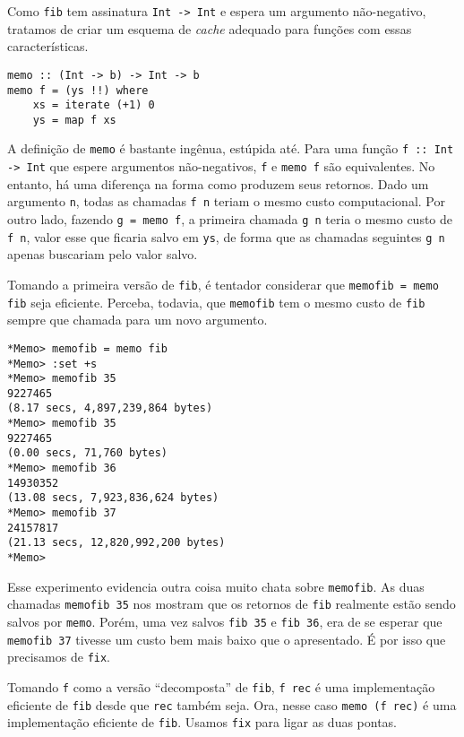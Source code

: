 \documentclass[a4paper]{article}
\begin{document}
Como \texttt{fib} tem assinatura \texttt{Int -> Int} e espera um argumento não-negativo, tratamos de criar um esquema de \emph{cache} adequado para funções com essas características.

\begin{verbatim}
memo :: (Int -> b) -> Int -> b
memo f = (ys !!) where
	xs = iterate (+1) 0
	ys = map f xs
\end{verbatim}

A definição de \texttt{memo} é bastante ingênua, estúpida até.
Para uma função \mbox{\texttt{f :: Int -> Int}} que espere argumentos não-negativos, \texttt{f} e \texttt{memo f} são equivalentes.
No entanto, há uma diferença na forma como produzem seus retornos.
Dado um argumento \texttt{n}, todas as chamadas \mbox{\texttt{f n}} teriam o mesmo custo computacional.
Por outro lado, fazendo \texttt{g = memo f}, a primeira chamada \texttt{g n} teria o mesmo custo de \texttt{f n}, valor esse que ficaria salvo em \texttt{ys}, de forma que as chamadas seguintes \texttt{g n} apenas buscariam pelo valor salvo.

Tomando a primeira versão de \texttt{fib}, é tentador considerar que \mbox{\texttt{memofib = memo fib}} seja eficiente.
Perceba, todavia, que \texttt{memofib} tem o mesmo custo de \texttt{fib} sempre que chamada para um novo argumento.

\begin{verbatim}
*Memo> memofib = memo fib
*Memo> :set +s
*Memo> memofib 35
9227465
(8.17 secs, 4,897,239,864 bytes)
*Memo> memofib 35
9227465
(0.00 secs, 71,760 bytes)
*Memo> memofib 36
14930352
(13.08 secs, 7,923,836,624 bytes)
*Memo> memofib 37
24157817
(21.13 secs, 12,820,992,200 bytes)
*Memo>
\end{verbatim}

Esse experimento evidencia outra coisa muito chata sobre \texttt{memofib}.
As duas chamadas \texttt{memofib 35} nos mostram que os retornos de \texttt{fib} realmente estão sendo salvos por \texttt{memo}.
Porém, uma vez salvos \texttt{fib 35} e \texttt{fib 36}, era de se esperar que \texttt{memofib 37} tivesse um custo bem mais baixo que o apresentado.
É por isso que precisamos de \texttt{fix}.

Tomando \texttt{f} como a versão ``decomposta'' de \texttt{fib}, \texttt{f rec} é uma implementação eficiente de \texttt{fib} desde que \texttt{rec} também seja.
Ora, nesse caso \texttt{memo (f rec)} é uma implementação eficiente de \texttt{fib}.
Usamos \texttt{fix} para ligar as duas pontas.
\end{document}
